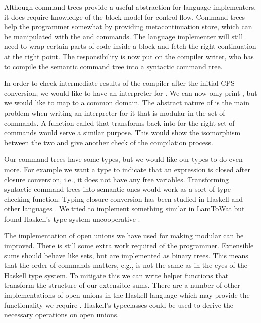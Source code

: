 Although command trees provide a useful abstraction for language implementers, it does require knowledge of the block model for control flow. Command trees help the programmer somewhat by providing metacontinuation store, which can be manipulated with the  and  commands. The language implementer will still need to wrap certain parts of code inside a block and fetch the right continuation at the right point. The responsibility is now put on the compiler writer, who has to compile the semantic command tree into a syntactic command tree.

In order to check intermediate results of the compiler after the initial CPS conversion, we would like to have an interpreter for . We can now only print , but we would like to map  to a common domain. The abstract nature of  is the main problem when writing an interpreter for it that is modular in the set of commands. A function called  that transforms  back into  for the right set of commands would serve a similar purpose. This would show the isomorphism between the two and give another check of the compilation process.

Our command trees have some types, but we would like our types to do even more. For example we want a type to indicate that an expression is closed after closure conversion, i.e., it does not have any free variables. Transforming syntactic command trees into semantic ones would work as a sort of type checking function. Typing closure conversion has been studied in Haskell and other languages \autocite{DBLP:conf/haskell/GuillemetteM07, DBLP:conf/pldi/Chlipala07, DBLP:conf/popl/MorrisettWCG98}. We tried to implement something similar in LamToWat but found Haskell's type system uncooperative \autocite{10.1145/2578854.2503786}.

The implementation of open unions we have used for making  modular can be improved. There is still some extra work required of the programmer. Extensible sums should behave like sets, but are implemented as binary trees. This means that the order of commands matters, e.g.,  is not the same as  in the eyes of the Haskell type system. To mitigate this we can write helper functions that transform the structure of our extensible sums. There are a number of other implementations of open unions in the Haskell language which may provide the functionality we require \autocite{extensible-effects, open-union}. Haskell's typeclasses could be used to derive the necessary operations on open unions.

